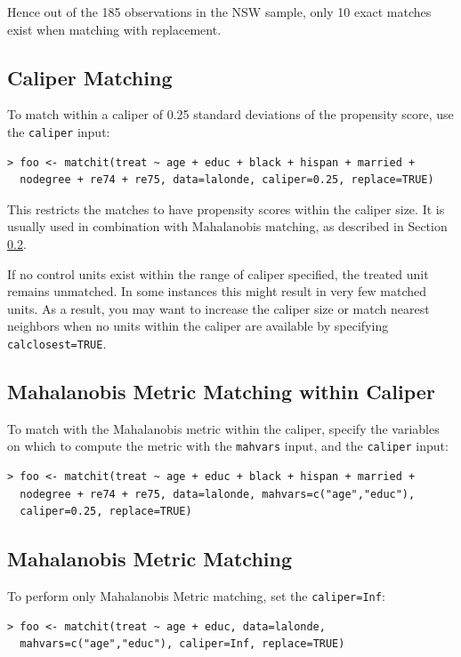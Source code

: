 \documentclass[oneside,letterpaper,titlepage]{article}
\begin{document}
Hence out of the 185 observations in the NSW sample, only 10 exact
matches exist when matching with replacement.

\subsection{Caliper Matching}

To match within a caliper of 0.25 standard deviations of the
propensity score, use the \texttt{caliper} input:

\begin{verbatim}
> foo <- matchit(treat ~ age + educ + black + hispan + married +
  nodegree + re74 + re75, data=lalonde, caliper=0.25, replace=TRUE)
\end{verbatim}

This restricts the matches to have propensity scores within the
caliper size.  It is usually used in combination with Mahalanobis
matching, as described in Section \ref{mahal}.

If no control units exist within the range of caliper specified, the
treated unit remains unmatched.  In some instances this might result
in very few matched units.  As a result, you may want to increase the
caliper size or match nearest neighbors when no units within the
caliper are available by specifying \texttt{calclosest=TRUE}.

\subsection{Mahalanobis Metric Matching within Caliper}
\label{mahal}
To match with the Mahalanobis metric within the caliper, specify the
variables on which to compute the metric with the \texttt{mahvars}
input, and the \texttt{caliper} input:

\begin{verbatim}
> foo <- matchit(treat ~ age + educ + black + hispan + married +
  nodegree + re74 + re75, data=lalonde, mahvars=c("age","educ"),
  caliper=0.25, replace=TRUE)
\end{verbatim}

\subsection{Mahalanobis Metric Matching}

To perform only Mahalanobis Metric matching, set the
\texttt{caliper=Inf}:

\begin{verbatim}
> foo <- matchit(treat ~ age + educ, data=lalonde,
  mahvars=c("age","educ"), caliper=Inf, replace=TRUE)
\end{verbatim}
\end{document}
